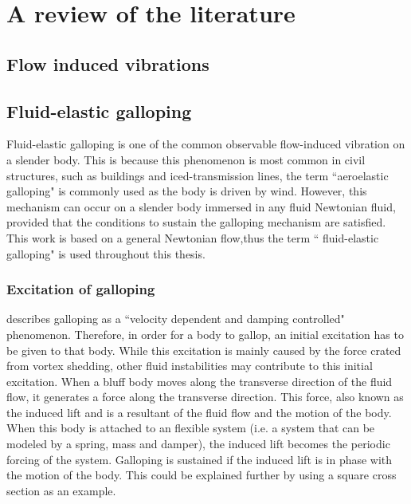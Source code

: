 \chapter{A review of the literature}

\section{Flow induced vibrations}
\label{sec:flow induced vibrations}


\section{Fluid-elastic galloping}
\label{fluid-elastic galloping}

Fluid-elastic galloping is one of the common observable flow-induced vibration on a slender body. This is because this phenomenon is most common in civil structures, such as buildings and iced-transmission lines, the term ``aeroelastic galloping" is commonly used as the body is driven by wind. However, this mechanism can occur on a slender body immersed in any fluid Newtonian fluid, provided that the conditions to sustain the galloping mechanism are satisfied. This work is based on a general Newtonian flow,thus the term `` fluid-elastic galloping" is used throughout this thesis.
   

\subsection{Excitation of galloping}
\label{sec:exci-galloping}

\citet{Paidoussis2010} describes galloping as a ``velocity dependent and damping controlled" phenomenon. Therefore, in order for a body to gallop, an initial excitation has to be given to that body. While this excitation is mainly caused by the force crated from vortex shedding, other fluid instabilities may contribute to this initial excitation.  When a bluff body moves along the transverse direction of the fluid flow, it generates a force along the transverse direction. This force, also known as the induced lift and is a resultant of the fluid flow and the motion of the body. When this body is attached to an flexible system (i.e. a system that can be modeled by a spring, mass and damper), the induced lift becomes the periodic forcing of the system. Galloping is sustained  if the induced lift is in phase with the motion of the body. This could be explained further by using a square cross section as an example.

